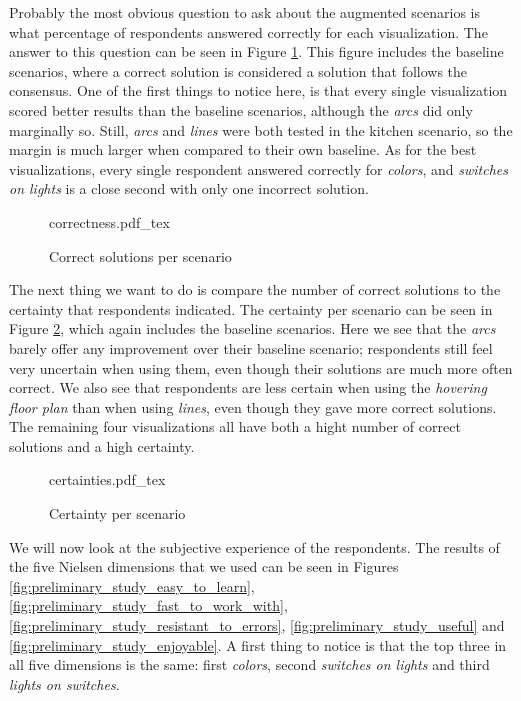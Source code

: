 Probably the most obvious question to ask about the augmented scenarios is what percentage of respondents answered correctly for each visualization. The answer to this question can be seen in Figure \ref{fig:preliminary_study_correctness}. This figure includes the baseline scenarios, where a correct solution is considered a solution that follows the consensus. One of the first things to notice here, is that every single visualization scored better results than the baseline scenarios, although the \textit{arcs} did only marginally so. Still, \textit{arcs} and \textit{lines} were both tested in the kitchen scenario, so the margin is much larger when compared to their own baseline. As for the best visualizations, every single respondent answered correctly for \textit{colors}, and \textit{switches on lights} is a close second with only one incorrect solution.

\begin{figure}
    \centering
    \def\svgwidth{\columnwidth}
    {correctness.pdf_tex}
    \caption{Correct solutions per scenario}
    \label{fig:preliminary_study_correctness}
\end{figure}

The next thing we want to do is compare the number of correct solutions to the certainty that respondents indicated. The certainty per scenario can be seen in Figure \ref{fig:preliminary_study_certainties}, which again includes the baseline scenarios. Here we see that the \textit{arcs} barely offer any improvement over their baseline scenario; respondents still feel very uncertain when using them, even though their solutions are much more often correct. We also see that respondents are less certain when using the \textit{hovering floor plan} than when using \textit{lines}, even though they gave more correct solutions. The remaining four visualizations all have both a hight number of correct solutions and a high certainty.

\begin{figure}
    \centering
    \def\svgwidth{\columnwidth}
    {certainties.pdf_tex}
    \caption{Certainty per scenario}
    \label{fig:preliminary_study_certainties}
\end{figure}

We will now look at the subjective experience of the respondents. The results of the five Nielsen dimensions that we used can be seen in Figures \ref{fig:preliminary_study_easy_to_learn}, \ref{fig:preliminary_study_fast_to_work_with}, \ref{fig:preliminary_study_resistant_to_errors}, \ref{fig:preliminary_study_useful} and \ref{fig:preliminary_study_enjoyable}. A first thing to notice is that the top three in all five dimensions is the same: first \textit{colors}, second \textit{switches on lights} and third \textit{lights on switches}.

